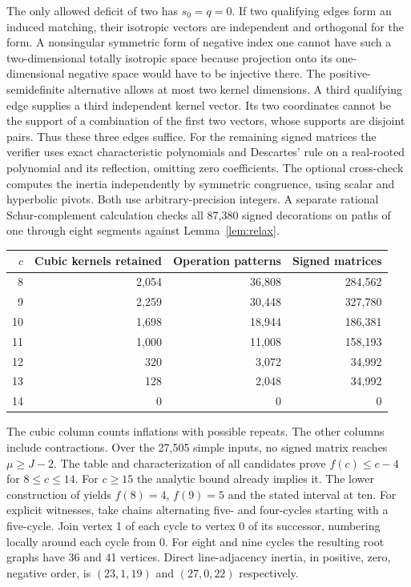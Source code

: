 \documentclass[11pt]{article}
\begin{document}
The only allowed deficit of two has $s_0=q=0$. If two qualifying edges form an induced matching, their isotropic vectors are independent and orthogonal for the form. A nonsingular symmetric form of negative index one cannot have such a two-dimensional totally isotropic space because projection onto its one-dimensional negative space would have to be injective there. The positive-semidefinite alternative allows at most two kernel dimensions. A third qualifying edge supplies a third independent kernel vector. Its two coordinates cannot be the support of a combination of the first two vectors, whose supports are disjoint pairs. Thus these three edges suffice. For the remaining signed matrices the verifier uses exact characteristic polynomials and Descartes' rule on a real-rooted polynomial and its reflection, omitting zero coefficients. The optional cross-check computes the inertia independently by symmetric congruence, using scalar and hyperbolic pivots. Both use arbitrary-precision integers. A separate rational Schur-complement calculation checks all 87,380 signed decorations on paths of one through eight segments against Lemma~\ref{lem:relax}.

\begin{center}
\begin{tabular}{rrrr}
\toprule
$c$ & Cubic kernels retained & Operation patterns & Signed matrices\\
\midrule
8 & 2,054 & 36,808 & 284,562\\
9 & 2,259 & 30,448 & 327,780\\
10 & 1,698 & 18,944 & 186,381\\
11 & 1,000 & 11,008 & 158,193\\
12 & 320 & 3,072 & 34,992\\
13 & 128 & 2,048 & 34,992\\
14 & 0 & 0 & 0\\
\bottomrule
\end{tabular}
\end{center}
The cubic column counts inflations with possible repeats. The other columns include contractions. Over the 27,505 simple inputs, no signed matrix reaches $\mu\ge J-2$. The table and characterization of all candidates prove $f(c)\le c-4$ for $8\le c\le14$. For $c\ge15$ the analytic bound already implies it. The lower construction of \cite{PP} yields $f(8)=4$, $f(9)=5$ and the stated interval at ten. For explicit witnesses, take chains alternating five- and four-cycles starting with a five-cycle. Join vertex 1 of each cycle to vertex 0 of its successor, numbering locally around each cycle from 0. For eight and nine cycles the resulting root graphs have 36 and 41 vertices. Direct line-adjacency inertia, in positive, zero, negative order, is $(23,1,19)$ and $(27,0,22)$ respectively.
\end{document}
